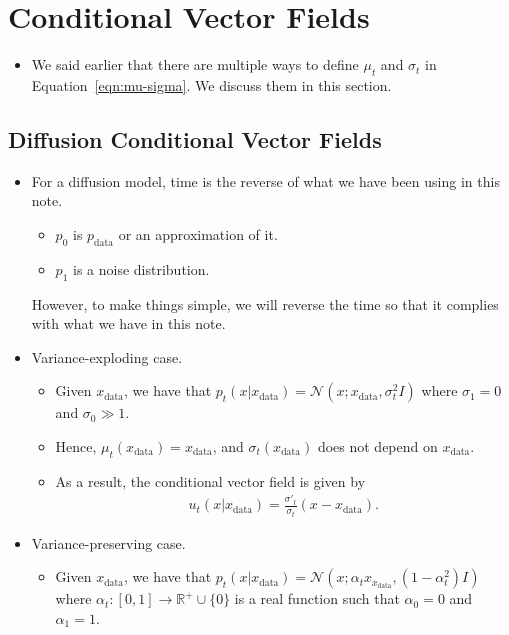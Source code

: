 \documentclass[10pt]{article}
\newcommand{\mcal}[1]{\mathcal{#1}}
\newcommand{\Real}{\mathbb{R}}
\newcommand{\data}{\mathrm{data}}
\begin{document}
\section{Conditional Vector Fields}

\begin{itemize}
  \item We said earlier that there are multiple ways to define $\mu_t$ and $\sigma_t$ in Equation~\eqref{eqn:mu-sigma}. We discuss them in this section.
\end{itemize}

\subsection{Diffusion Conditional Vector Fields}

\begin{itemize}
  \item For a diffusion model, time is the reverse of what we have been using in this note.
  \begin{itemize}
    \item $p_0$ is $p_{\data}$ or an approximation of it.
    \item $p_1$ is a noise distribution.
  \end{itemize}
  However, to make things simple, we will reverse the time so that it complies with what we have in this note.

  \item Variance-exploding case.
  \begin{itemize}
    \item Given $x_{\data}$, we have that $p_t(x|x_{\data}) = \mcal{N}(x; x_{\data}, \sigma_t^2 I )$ where $\sigma_1 = 0$ and $\sigma_0 \gg 1$. 
    \item Hence, $\mu_t(x_{\data}) = x_{\data}$, and $\sigma_t(x_{\data})$ does not depend on $x_{\data}$.
    \item As a result, the conditional vector field is given by
    \begin{align*}
      u_t(x|x_\data) = \frac{\sigma'_t}{\sigma_t} (x - x_{\data}).
    \end{align*}
  \end{itemize}

  \item Variance-preserving case.
  \begin{itemize}
    \item Given $x_{\data}$, we have that $p_t(x|x_{\data}) = \mcal{N}(x; \alpha_t x_{x_{\data}}, (1 - \alpha_t^2)I)$ where $\alpha_t: [0,1] \rightarrow \Real^{+} \cup \{ 0 \}$ is a real function such that $\alpha_0 = 0$ and $\alpha_1 = 1$.
    

\end{itemize}
\end{itemize}
\end{document}
